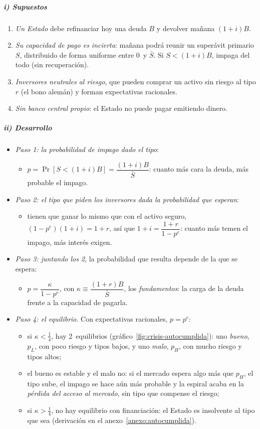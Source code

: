 \documentclass[11pt]{article}
\begin{document}
\subparagraph{i) Supuestos}

\begin{enumerate}
\item \emph{Un Estado} debe refinanciar hoy una deuda $B$ y devolver mañana $(1+i)B$.
\item \emph{Su capacidad de pago es incierta}: mañana podrá reunir un superávit primario $S$, distribuido de forma uniforme entre 0~y $\bar S$. Si $S<(1+i)B$, impaga del todo (sin recuperación).
\item \emph{Inversores neutrales al riesgo}, que pueden comprar un activo sin riesgo al tipo $r$ (el bono alemán) y forman expectativas racionales.
\item \emph{Sin banco central propio}: el Estado no puede pagar emitiendo dinero.
\end{enumerate}

\subparagraph{ii) Desarrollo}

\begin{itemize}
\item \emph{Paso 1: la probabilidad de impago dado el tipo}:
  \begin{itemize}
  \item $p=\Pr\left[S<(1+i)B\right]=\dfrac{(1+i)B}{\bar S}$: cuanto más cara la deuda, más probable el impago.
  \end{itemize}
\item \emph{Paso 2: el tipo que piden los inversores dada la probabilidad que esperan}:
  \begin{itemize}
  \item tienen que ganar lo mismo que con el activo seguro, $(1-p^e)(1+i)=1+r$, así que $1+i=\dfrac{1+r}{1-p^e}$: cuanto más temen el impago, más interés exigen.
  \end{itemize}
\item \emph{Paso 3: juntando los 2}, la probabilidad que resulta depende de la que se espera:
  \begin{itemize}
  \item $p=\dfrac{\kappa}{1-p^e}$, con $\kappa\equiv\dfrac{(1+r)B}{\bar S}$, los \emph{fundamentos}: la carga de la deuda frente a la capacidad de pagarla.
  \end{itemize}
\item \emph{Paso 4: el equilibrio}. Con expectativas racionales, $p=p^e$:
  \begin{itemize}
  \item si $\kappa<\tfrac14$, hay 2~equilibrios (gráfico~\ref{fig:crisis-autocumplida}): uno \emph{bueno}, $p_L$, con poco riesgo y tipos bajos, y uno \emph{malo}, $p_H$, con mucho riesgo y tipos altos;
  \item el bueno es estable y el malo no: si el mercado espera algo más que $p_H$, el tipo sube, el impago se hace aún más probable y la espiral acaba en la \emph{pérdida del acceso al mercado}, sin tipo que compense el riesgo;
  \item si $\kappa>\tfrac14$, no hay equilibrio con financiación: el Estado es insolvente al tipo que sea (derivación en el anexo~\ref{anexo:autocumplida}).
  \end{itemize}
\end{itemize}
\end{document}
